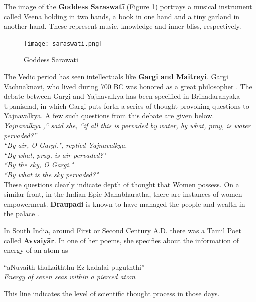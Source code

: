 \documentclass[a4paper,10pt]{article}
\begin{document}
The image of the \textbf{Goddess Saraswat\={i}} (Figure 1) portrays a musical instrument called Veena holding in  two hands, a book in one hand and a tiny garland in another hand. These represent music, knowledge and inner bliss, respectively. 
\begin{center}
\begin{figure}[h]
\centering
 \texttt{[image: saraswati.png]}
 \caption{Goddess Sarawati}
\end{figure}
\end{center}

The Vedic period has seen intellectuals like \textbf{Gargi and Maitreyi}. Gargi Vachnaknavi, who lived during 700 BC was honored as a great philosopher \cite{Gargi}. The debate between Gargi and Yajnavalkya has been specified in Brihadaranyaka Upanishad, in which Gargi puts forth a series of thought provoking questions to Yajnavalkya. A few such questions from this debate are given below. \\

\textit{Yajnavalkya ,`` said she, ``if all this is pervaded by water, by  what, pray, is water pervaded?''} \\
\textit{``By air, O Gargi.", replied Yajnavalkya.} \\
\textit{``By what, pray, is air pervaded?" }\\
\textit{``By the sky, O Gargi."} \\
\textit{``By what is the sky pervaded?"}  \\

These questions clearly indicate depth of thought that Women possess. On a similar front, in the Indian Epic Mahabharatha, there are instances of women empowerment. \textbf{Draupadi} is known to have managed the people and wealth in the palace \cite{mahabharatha}. 

In South India, around First or Second Century A.D. there was a Tamil Poet called \textbf{Avvaiy\={a}r}. In one of her poems, she specifies about the information of energy of an atom as \\
\begin{center}
``aNuvaith thuLaiththu Ez kadalai puguththi'' \\
\textit{Energy of seven seas within a pierced atom}\\
\end{center}
This line indicates the level of scientific thought process in those days. 
\end{document}
